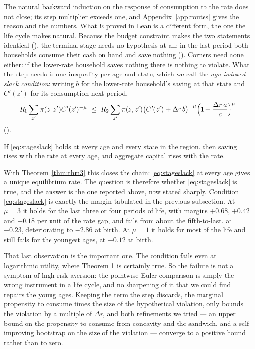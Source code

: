 The natural backward induction on the response of consumption to the rate does not close; its step
multiplier exceeds one, and Appendix~\ref{app:routes} gives the reason and the numbers. What is proved
in Lean is a different form, the one the life cycle makes natural.
Because the budget constraint makes the two statements identical
(), the terminal stage needs no hypothesis at all: in
the last period both households consume their cash on hand and save nothing
(). Corners need none either: if the lower-rate household saves
nothing there is nothing to violate. What the step needs is one inequality per age and state,
which we call the \emph{age-indexed slack condition}: writing $b$ for the lower-rate household's
saving at that state and $C'(z')$ for its consumption next period,
\begin{equation}\label{eq:stageslack}
  R_1\sum_{z'}\pi(z,z')C'(z')^{-\mu}\ \le\
  R_2\sum_{z'}\pi(z,z')\bigl(C'(z')+\Delta r\,b\bigr)^{-\mu}
  \Bigl(1+\frac{\Delta r\,a}{c}\Bigr)^{\mu}
\end{equation}
().

\begin{theorem}[The reduction]\label{thm:reduction}
If \eqref{eq:stageslack} holds at every age and every state in the region, then saving rises with
the rate at every age, and aggregate capital rises with the rate.
\end{theorem}

With Theorem~\ref{thm:thm3} this closes the chain: \eqref{eq:stageslack} at every age gives a
unique equilibrium rate. The question is therefore whether \eqref{eq:stageslack} is true, and the
answer is the one reported above, now stated sharply. Condition \eqref{eq:stageslack} is exactly
the margin tabulated in the previous subsection. At $\mu=3$ it holds for the last three or four
periods of life, with margins $+0.68$, $+0.42$ and $+0.18$ per unit of the rate gap, and fails
from about the fifth-to-last, at $-0.23$, deteriorating to $-2.86$ at birth. At $\mu=1$ it holds
for most of the life and still fails for the youngest ages, at $-0.12$ at birth.

That last observation is the important one. The condition fails even at logarithmic utility,
where Theorem 1 is certainly true. So the failure is not a symptom of high risk aversion: the
pointwise Euler comparison is simply the wrong instrument in a life cycle, and no sharpening of
it that we could find repairs the young ages. Keeping the term the step discards, the marginal
propensity to consume times the size of the hypothetical violation, only bounds the violation by
a multiple of $\Delta r$, and both refinements we tried --- an upper bound on the propensity to
consume from concavity and the sandwich, and a self-improving bootstrap on the size of the
violation --- converge to a positive bound rather than to zero.


